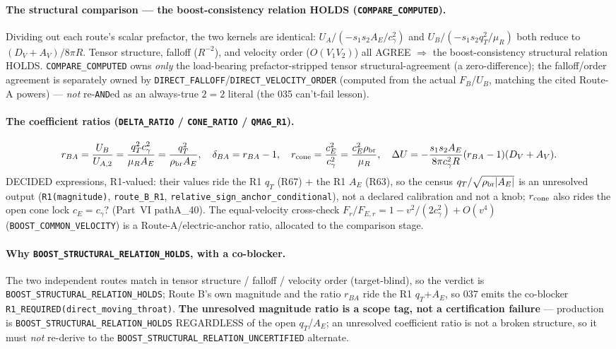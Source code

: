\paragraph{The structural comparison --- the boost-consistency relation HOLDS (\texttt{COMPARE\_COMPUTED}).}
Dividing out each route's scalar prefactor, the two kernels are identical:
\(U_A/(-s_1s_2A_E/c_\gamma^2)\) and \(U_B/(-s_1s_2q_T^2/\mu_R)\) both
reduce to \((D_V+A_V)/8\pi R\). Tensor structure, falloff (\(R^{-2}\)),
and velocity order (\(O(V_1V_2)\)) all AGREE \(\Rightarrow\) the
boost-consistency structural relation HOLDS. \texttt{COMPARE\_COMPUTED}
owns \emph{only} the load-bearing prefactor-stripped tensor
structural-agreement (a zero-difference); the falloff/order agreement is
separately owned by \texttt{DIRECT\_FALLOFF}/\texttt{DIRECT\_VELOCITY\_ORDER}
(computed from the actual \(F_B\)/\(U_B\), matching the cited Route-A
powers) --- \emph{not} re-\texttt{AND}ed as an always-true \(2{=}2\)
literal (the 035 can't-fail lesson).

\paragraph{The coefficient ratios (\texttt{DELTA\_RATIO} / \texttt{CONE\_RATIO} / \texttt{QMAG\_R1}).}
\[
  r_{BA}=\frac{U_B}{U_{A,2}}=\frac{q_T^2c_\gamma^2}{\mu_R A_E}
        =\frac{q_T^2}{\rho_{\rm br}A_E},\quad
  \delta_{BA}=r_{BA}-1,\quad
  r_{\rm cone}=\frac{c_E^2}{c_\gamma^2}=\frac{c_E^2\rho_{\rm br}}{\mu_R},\quad
  \Delta U=-\frac{s_1s_2A_E}{8\pi c_\gamma^2R}(r_{BA}-1)(D_V+A_V).
\]
DECIDED expressions, R1-valued: their values ride the R1 \(q_T\) (R67) +
the R1 \(A_E\) (R63), so the census \(q_T/\sqrt{\rho_{\rm br}|A_E|}\) is an
unresolved output (\texttt{R1(magnitude)}, \texttt{route\_B\_R1},
\texttt{relative\_sign\_anchor\_conditional}), not a declared calibration
and not a knob; \(r_{\rm cone}\) also rides the open cone lock
\(c_E{=}c_\gamma?\) (Part~VI pathA\_40). The equal-velocity cross-check
\(F_r/F_{E,r}=1-v^2/(2c_\gamma^2)+O(v^4)\) (\texttt{BOOST\_COMMON\_VELOCITY})
is a Route-A/electric-anchor ratio, allocated to the comparison stage.

\paragraph{Why \texttt{BOOST\_STRUCTURAL\_RELATION\_HOLDS}, with a co-blocker.}
The two independent routes match in tensor structure / falloff / velocity
order (target-blind), so the verdict is
\texttt{BOOST\_STRUCTURAL\_RELATION\_HOLDS}; Route B's own magnitude and
the ratio \(r_{BA}\) ride the R1 \(q_T\)+\(A_E\), so 037 emits the
co-blocker \texttt{R1\_REQUIRED(direct\_moving\_throat)}. \textbf{The
unresolved magnitude ratio is a scope tag, not a certification failure}
--- production is \texttt{BOOST\_STRUCTURAL\_RELATION\_HOLDS} REGARDLESS of
the open \(q_T\)/\(A_E\); an unresolved coefficient ratio is not a broken
structure, so it must \emph{not} re-derive to the
\texttt{BOOST\_STRUCTURAL\_RELATION\_UNCERTIFIED} alternate.

